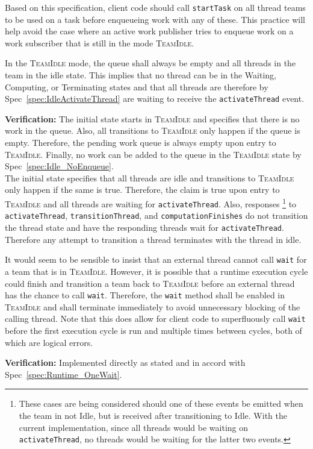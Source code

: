 \documentclass{article}
\newcommand{\TeamIdle}          {\textsc{TeamIdle}}
\begin{document}
Based on this specification, client code should call \texttt{startTask} on all
thread teams to be used on a task before enqueueing work with any of these.  This
practice will help avoid the case where an active work publisher tries to
enqueue work on a work subscriber that is still in the mode \TeamIdle.

\begin{spec}
In the {\TeamIdle} mode, the queue shall always be empty and all threads in the
team in the idle state.  This implies that no thread can be in the Waiting,
Computing, or Terminating states and that all threads are therefore by
Spec~\ref{spec:IdleActivateThread} are waiting to receive the
\texttt{activateThread} event.
\end{spec}
\textbf{Verification:}\hspace{0.125in}  The initial state starts in {\TeamIdle}
and specifies that there is no work in the queue.  Also, all transitions to
{\TeamIdle} only happen if the queue is empty.  Therefore, the pending work
queue is always empty upon entry to \TeamIdle.  Finally, no work can be added to
the queue in the {\TeamIdle} state by Spec~\ref{spec:Idle_NoEnqueue}.\\

The initial state specifies that all threads are idle and transitions to
{\TeamIdle} only happen if the same is true.  Therefore, the claim is true upon
entry to {\TeamIdle} and all threads are waiting for \texttt{activateThread}.
Also, responses
\footnote{These cases are being considered should one of these
events be emitted when the team in not Idle, but is received after transitioning
to Idle.  With the current implementation, since all threads would be waiting on
\texttt{activateThread}, no threads would be waiting for the latter two events.}
to \texttt{activateThread}, \texttt{transitionThread}, and
\texttt{computationFinishes} do not transition the thread state and have the
responding threads wait for \texttt{activateThread}.  Therefore any attempt to
transition a thread terminates with the thread in idle.

\begin{spec}
It would seem to be sensible to insist that an external thread cannot call
\texttt{wait} for a team that is in \TeamIdle.  However, it is possible that a
runtime execution cycle could finish and transition a team back to {\TeamIdle}
before an external thread has the chance to call \texttt{wait}.  Therefore, the
\texttt{wait} method shall be enabled in {\TeamIdle} and shall terminate immediately to avoid
unnecessary blocking of the calling thread.  Note that this does allow for
client code to superfluously call \texttt{wait} before the first execution cycle
is run and multiple times between cycles, both of which are logical errors.
\end{spec}
\textbf{Verification:}\hspace{0.125in}  Implemented directly as stated and in
accord with Spec~\ref{spec:Runtime_OneWait}.  
\end{document}
